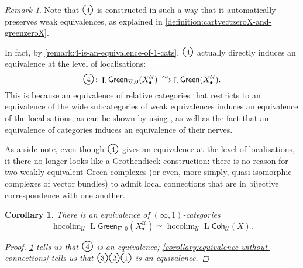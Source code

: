 \documentclass[11pt,fleqn]{article}
\theoremstyle{plain}
\newtheorem{corollary}[theorem]{Corollary}
\theoremstyle{definition}
\theoremstyle{remark}
\newtheorem{remark}[theorem]{Remark}
\numberwithin{equation}{theorem}
\newcommand{\cover}{\mathcal{U}}
\newcommand{\congto}{\xrightarrow{\raisebox{-.5ex}[0ex][0ex]{$\sim$}}}
\newcommand{\gcohUX}{\mathsf{Coh}_{\cover}(X)}
\newcommand{\greenX}{\mathsf{Green}(X_\bullet^\cover)}
\newcommand{\greenzeroX}{\mathsf{Green}_{\nabla,0}(X_\bullet^\cover)}
\newcommand{\numberincircle}[1]{\text{\normalfont\Large\textcircled{\small #1}}}
\DeclareMathOperator{\LL}{L}
\DeclareMathOperator{\hocolim}{hocolim}
\begin{document}
        \begin{remark}\label{remark:diagram-descends-to-infty-1-and-4-is-equivalence}
            Note that $\numberincircle{4}$ is constructed in such a way that it automatically preserves weak equivalences, as explained in \cref{definition:cartvectzeroX-and-greenzeroX}.

            In fact, by \cref{remark:4-is-an-equivalence-of-1-cats}, $\numberincircle{4}$ actually directly induces an equivalence at the level of localisations:
            \[
                \numberincircle{4}\colon
                \LL{\greenzeroX}
                \congto
                \LL{\greenX}.
            \]
            This is because an equivalence of relative categories that restricts to an equivalence of the wide subcategories of weak equivalences induces an equivalence of the localisations, as can be shown by using \cite[Lemma~5.4]{Barwick&Kan2012}, as well as the fact that an equivalence of categories induces an equivalence of their nerves.
    
            As a side note, even though $\numberincircle{4}$ gives an equivalence at the level of localisations, it there no longer looks like a Grothendieck construction: there is no reason for two weakly equivalent Gre{}en complexes (or even, more simply, quasi-isomorphic complexes of vector bundles) to admit local connections that are in bijective correspondence with one another.
        \end{remark}

        \begin{corollary}\label{theorem:the-main-coherent-theorem}
            There is an equivalence of $(\infty,1)$-categories
            \begin{equation*}
                \hocolim_\cover\LL{\greenzeroX} \simeq \hocolim_\cover\LL{\gcohUX}.
            \end{equation*}
            \begin{proof}
                \cref{remark:diagram-descends-to-infty-1-and-4-is-equivalence} tells us that $\numberincircle{4}$ is an equivalence; \cref{corollary:equivalence-without-connections} tells us that $\numberincircle{3}\numberincircle{2}\numberincircle{1}$ is an equivalence.
            \end{proof}
        \end{corollary}
\end{document}
